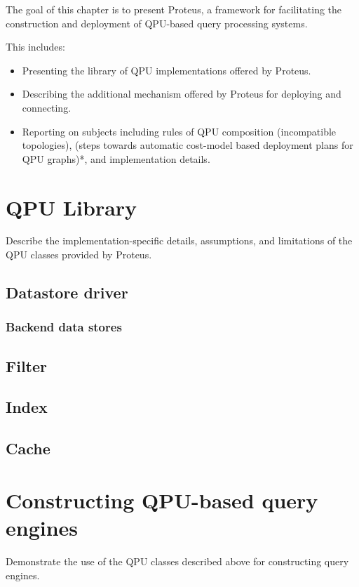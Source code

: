 The goal of this chapter is to present Proteus, a framework for facilitating
the construction and deployment of QPU-based query processing systems.

This includes:
\begin{itemize}
  \item Presenting the library of QPU implementations offered by Proteus.
  \item Describing the additional mechanism offered by Proteus for deploying and
  connecting.
  \item Reporting on subjects including rules of QPU composition (incompatible
  topologies), (steps towards automatic cost-model based deployment plans for
  QPU graphs)*, and implementation details.
\end{itemize}

\section{QPU Library}
Describe the implementation-specific details, assumptions, and limitations of
the QPU classes provided by Proteus.

\subsection{Datastore driver}
\subsubsection{Backend data stores}

\subsection{Filter}

\subsection{Index}

\subsection{Cache}


\section{Constructing QPU-based query engines}
Demonstrate the use of the QPU classes described above for constructing query
engines.

